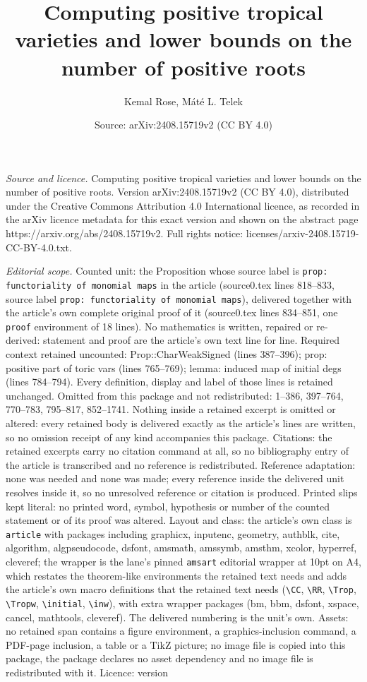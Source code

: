\documentclass[10pt,a4paper]{amsart}
\title[Computing positive tropical varieties and lower bounds on th]{Computing positive tropical varieties and lower bounds on the number of positive roots}
\author{Kemal Rose, M\'at\'e L. Telek}
\date{Source: arXiv:2408.15719v2 (CC BY 4.0)}
\begin{document}
\maketitle

\noindent\emph{Source and licence.} Computing positive tropical varieties and lower bounds on the number of positive roots. Version arXiv:2408.15719v2 (CC BY 4.0), distributed under the Creative Commons Attribution 4.0 International licence, as recorded in the arXiv licence metadata for this exact version and shown on the abstract page https://arxiv.org/abs/2408.15719v2. Full rights notice: licenses/arxiv-2408.15719-CC-BY-4.0.txt.\par\smallskip

\noindent\textit{Editorial scope.} Counted unit: the Proposition whose source label is \texttt{prop: functoriality of monomial maps} in the article (source0.tex lines 818--833, source label \texttt{prop: functoriality of monomial maps}), delivered together with the article's own complete original proof of it (source0.tex lines 834--851, one \texttt{proof} environment of 18 lines). No mathematics is written, repaired or re-derived: statement and proof are the article's own text line for line. Required context retained uncounted: Prop::CharWeakSigned (lines 387--396); prop: positive part of toric vars (lines 765--769); lemma: induced map of initial degs (lines 784--794). Every definition, display and label of those lines is retained unchanged. Omitted from this package and not redistributed: 1--386, 397--764, 770--783, 795--817, 852--1741. Nothing inside a retained excerpt is omitted or altered: every retained body is delivered exactly as the article's lines are written, so no omission receipt of any kind accompanies this package. Citations: the retained excerpts carry no citation command at all, so no bibliography entry of the article is transcribed and no reference is redistributed. Reference adaptation: none was needed and none was made; every reference inside the delivered unit resolves inside it, so no unresolved reference or citation is produced. Printed slips kept literal: no printed word, symbol, hypothesis or number of the counted statement or of its proof was altered. Layout and class: the article's own class is \texttt{article} with packages including graphicx, inputenc, geometry, authblk, cite, algorithm, algpseudocode, dsfont, amsmath, amssymb, amsthm, xcolor, hyperref, cleveref; the wrapper is the lane's pinned \texttt{amsart} editorial wrapper at 10pt on A4, which restates the theorem-like environments the retained text needs and adds the article's own macro definitions that the retained text needs (\texttt{\textbackslash CC}, \texttt{\textbackslash RR}, \texttt{\textbackslash Trop}, \texttt{\textbackslash Tropw}, \texttt{\textbackslash initial}, \texttt{\textbackslash inw}), with extra wrapper packages (bm, bbm, dsfont, xspace, cancel, mathtools, cleveref). The delivered numbering is the unit's own. Assets: no retained span contains a figure environment, a graphics-inclusion command, a PDF-page inclusion, a table or a TikZ picture; no image file is copied into this package, the package declares no asset dependency and no image file is redistributed with it. Licence: version 
\end{document}
